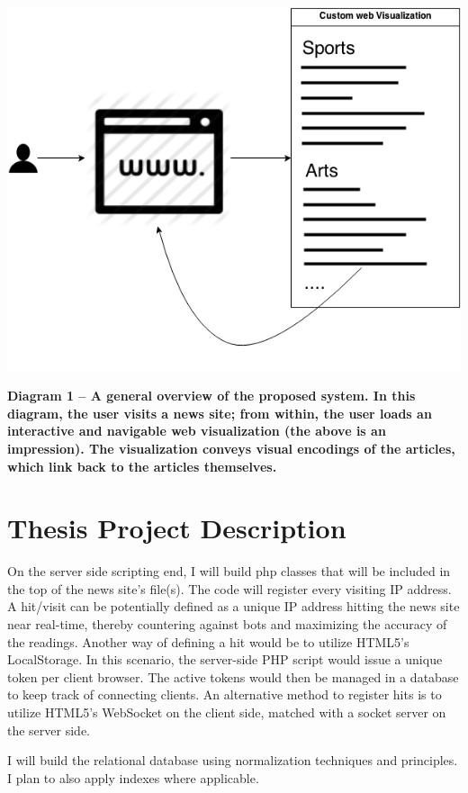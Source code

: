 \documentclass[12pt]{article}
\begin{document}
\includegraphics[scale=0.6]{img/overall_chart}

\noindent\textbf{Diagram 1 -- A general overview of the proposed system. In this diagram, the user visits a news site; from within, the user loads an interactive and navigable web visualization (the above is an impression). The visualization conveys visual encodings of the articles, which link back to the articles themselves.}

\vfill

\section{Thesis Project Description}
On the server side scripting end, I will build php classes that will be included in the top of the news site's file(s). The code will register every visiting IP address. A hit/visit can be potentially defined as a unique IP address hitting the news site near real-time, thereby countering against bots and maximizing the accuracy of the readings. Another way of defining a hit would be to utilize HTML5’s LocalStorage. In this scenario, the server-side PHP script would issue a unique token per client browser. The active tokens would then be managed in a database to keep track of connecting clients. An alternative method to register hits is to utilize HTML5’s WebSocket on the client side, matched with a socket server on the server side.

I will build the relational database using normalization techniques and principles. I plan to also apply indexes where applicable.
\end{document}
